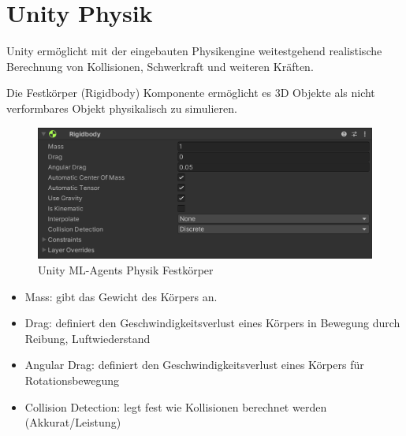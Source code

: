 {\section{Unity Physik}}
\label{sec:physik}
Unity ermöglicht mit der eingebauten Physikengine weitestgehend realistische Berechnung von Kollisionen, Schwerkraft und weiteren Kräften.

Die Festkörper (Rigidbody) Komponente ermöglicht es 3D Objekte als nicht verformbares Objekt physikalisch zu simulieren.
\begin{figure}[H]
  \centering  
  \includegraphics[scale=0.5]{img/physik_festkoerper.png}
  \caption{Unity ML-Agents Physik Festkörper}
  \label{fig:physik_festkoerper}
\end{figure}
\begin{itemize}
  \item Mass: gibt das Gewicht des Körpers an.
  \item Drag: definiert den Geschwindigkeitsverlust eines Körpers in Bewegung durch Reibung, Luftwiederstand
  \item Angular Drag: definiert den Geschwindigkeitsverlust eines Körpers für Rotationsbewegung
  \item Collision Detection: legt fest wie Kollisionen berechnet werden (Akkurat/Leistung)
 \end{itemize}
 
